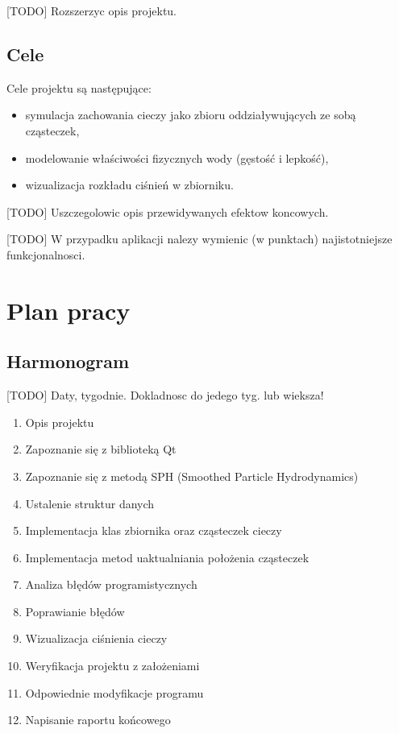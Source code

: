 \documentclass[a4paper]{article}
\begin{document}
[TODO] Rozszerzyc opis projektu.

\subsection{Cele}
Cele projektu są następujące:
\begin{itemize}
  \item symulacja zachowania cieczy jako zbioru oddziaływujących ze sobą cząsteczek,
  \item modelowanie właściwości fizycznych wody (gęstość i lepkość),
  \item wizualizacja rozkładu ciśnień w zbiorniku.
\end{itemize}


[TODO] Uszczegolowic opis przewidywanych efektow koncowych.


[TODO] W przypadku aplikacji nalezy wymienic (w punktach) najistotniejsze funkcjonalnosci.

\section{Plan pracy}
\subsection{Harmonogram}

[TODO] Daty, tygodnie. Dokladnosc do jedego tyg. lub wieksza!

\begin{enumerate}[label=Z\arabic*{.}]
  \item Opis projektu
  \item Zapoznanie się z biblioteką Qt
  \item Zapoznanie się z metodą SPH (Smoothed Particle Hydrodynamics)
  \item Ustalenie struktur danych
  \item Implementacja klas zbiornika oraz cząsteczek cieczy 
  \item Implementacja metod uaktualniania położenia cząsteczek
  \item Analiza błędów programistycznych
  \item Poprawianie błędów
  \item Wizualizacja ciśnienia cieczy
  \item Weryfikacja projektu z założeniami
  \item Odpowiednie modyfikacje programu
  \item Napisanie raportu końcowego
\end{enumerate}
\end{document}
